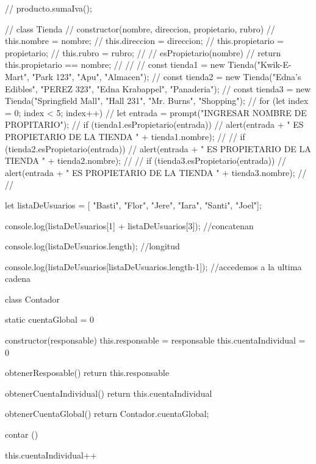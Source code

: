 // producto.sumaIva();

// class Tienda{
// constructor(nombre, direccion, propietario, rubro){
// this.nombre = nombre;
// this.direccion = direccion;
// this.propietario = propietario;
// this.rubro = rubro;
// }
// esPropietario(nombre){
// return this.propietario == nombre;
// }
// }
// const tienda1 = new Tienda("Kwik-E-Mart", "Park 123", "Apu", "Almacen");
// const tienda2 = new Tienda("Edna's Edibles", "PEREZ 323", "Edna Krabappel", "Panaderia");
// const tienda3 = new Tienda("Springfield Mall", "Hall 231", "Mr. Burns", "Shopping");
// for (let index = 0; index < 5; index++) {
// let entrada = prompt("INGRESAR NOMBRE DE PROPITARIO");
// if (tienda1.esPropietario(entrada)){
// alert(entrada + " ES PROPIETARIO DE LA TIENDA " + tienda1.nombre);
// }
// if (tienda2.esPropietario(entrada)){
// alert(entrada + " ES PROPIETARIO DE LA TIENDA " + tienda2.nombre);
// }
// if (tienda3.esPropietario(entrada)){
// alert(entrada + " ES PROPIETARIO DE LA TIENDA " + tienda3.nombre);
// }
// }

let listaDeUsuarios = [ "Basti", "Flor", "Jere", "Iara", "Santi", "Joel"];

console.log(listaDeUsuarios[1] + listaDeUsuarios[3]); //concatenan

console.log(listaDeUsuarios.length); //longitud

console.log(listaDeUsuarios[listaDeUsuarios.length-1]); //accedemos a la ultima cadena


class Contador {

    static cuentaGlobal = 0

    constructor(responsable) {
        this.responsable = responsable
        this.cuentaIndividual = 0
    }

    obtenerResposable(){
        return this.responsable
    }

    obtenerCuentaIndividual(){
        return this.cuentaIndividual
    }

    obtenerCuentaGlobal(){
        return Contador.cuentaGlobal;
    }

    contar (){
        this.cuentaIndividual++

    }

}
